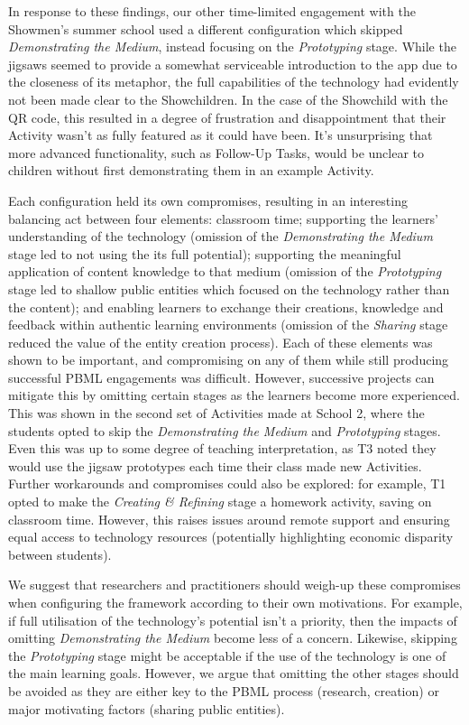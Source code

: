In response to these findings, our other time-limited engagement with the Showmen's summer school used a different configuration which skipped \textit{Demonstrating the Medium}, instead focusing on the \textit{Prototyping} stage. While the jigsaws seemed to provide a somewhat serviceable introduction to the app due to the closeness of its metaphor, the full capabilities of the technology had evidently not been made clear to the Showchildren. In the case of the Showchild with the QR code, this resulted in a degree of frustration and disappointment that their Activity wasn't as fully featured as it could have been. It's unsurprising that more advanced functionality, such as Follow-Up Tasks, would be unclear to children without first demonstrating them in an example Activity.

Each configuration held its own compromises, resulting in an interesting balancing act between four elements: classroom time; supporting the learners' understanding of the technology (omission of the \textit{Demonstrating the Medium} stage led to not using the its full potential); supporting the meaningful application of content knowledge to that medium (omission of the \textit{Prototyping} stage led to shallow public entities which focused on the technology rather than the content); and enabling learners to exchange their creations, knowledge and feedback within authentic learning environments (omission of the \textit{Sharing} stage reduced the value of the entity creation process). Each of these elements was shown to be important, and compromising on any of them while still producing successful PBML engagements was difficult. However, successive projects can mitigate this by omitting certain stages as the learners become more experienced. This was shown in the second set of Activities made at School 2, where the students opted to skip the \textit{Demonstrating the Medium} and \textit{Prototyping} stages. Even this was up to some degree of teaching interpretation, as T3 noted they would use the jigsaw prototypes each time their class made new Activities. Further workarounds and compromises could also be explored: for example, T1 opted to make the \textit{Creating \& Refining} stage a homework activity, saving on classroom time. However, this raises issues around remote support and ensuring equal access to technology resources (potentially highlighting economic disparity between students).

We suggest that researchers and practitioners should weigh-up these compromises when configuring the framework according to their own motivations. For example, if full utilisation of the technology's potential isn't a priority, then the impacts of omitting \textit{Demonstrating the Medium} become less of a concern. Likewise, skipping the \textit{Prototyping} stage might be acceptable if the use of the technology is one of the main learning goals. However, we argue that omitting the other stages should be avoided as they are either key to the PBML process (research, creation) or major motivating factors (sharing public entities).

